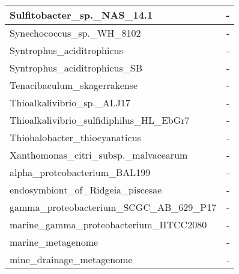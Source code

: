 \documentclass[12pt,a4paper]{article}
\begin{document}
\begin{table}[ht]
\begin{center}
\begin{tabular}{|l*{1}{|r}|}
Sulfitobacter\_sp.\_NAS\_14.1 & - \\ \hline
Synechococcus\_sp.\_WH\_8102 & - \\ \hline
Syntrophus\_aciditrophicus & - \\ \hline
Syntrophus\_aciditrophicus\_SB & - \\ \hline
Tenacibaculum\_skagerrakense & - \\ \hline
Thioalkalivibrio\_sp.\_ALJ17 & - \\ \hline
Thioalkalivibrio\_sulfidiphilus\_HL\_EbGr7 & - \\ \hline
Thiohalobacter\_thiocyanaticus & - \\ \hline
Xanthomonas\_citri\_subsp.\_malvacearum & - \\ \hline
alpha\_proteobacterium\_BAL199 & - \\ \hline
endosymbiont\_of\_Ridgeia\_piscesae & - \\ \hline
gamma\_proteobacterium\_SCGC\_AB\_629\_P17 & - \\ \hline
marine\_gamma\_proteobacterium\_HTCC2080 & - \\ \hline
marine\_metagenome & - \\ \hline
mine\_drainage\_metagenome & - \\ \hline
\end{tabular}
\end{center}
\end{table}
\end{document}
